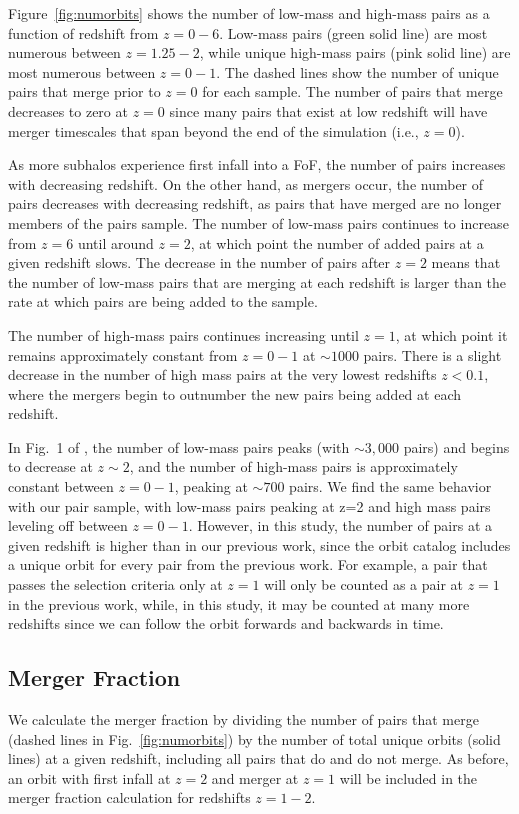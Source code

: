 \documentclass[twocolumn,linenumbers]{aastex631}
\newcommand{\chambe}{\citet{Chamberlain2024}}
\begin{document}
Figure~\ref{fig:numorbits} shows the number of low-mass and high-mass pairs as a function of redshift from $z=0-6$. 
Low-mass pairs (green solid line) are most numerous between $z=1.25-2$, while unique high-mass pairs (pink solid line) are most numerous between $z=0-1$.
The dashed lines show the number of unique pairs that merge prior to $z=0$ for each sample. 
The number of pairs that merge decreases to zero at $z=0$ since many pairs that exist at low redshift will have merger timescales that span beyond the end of the simulation (i.e., $z=0$). 

As more subhalos experience first infall into a FoF, the number of pairs increases with decreasing redshift. 
On the other hand, as mergers occur, the number of pairs decreases with decreasing redshift, as pairs that have merged are no longer members of the pairs sample.
The number of low-mass pairs continues to increase from $z=6$ until around $z=2$, at which point the number of added pairs at a given redshift slows. 
The decrease in the number of pairs after $z=2$ means that the number of low-mass pairs that are merging at each redshift is larger than the rate at which pairs are being added to the sample.

The number of high-mass pairs continues increasing until $z=1$, at which point it remains approximately constant from $z=0-1$ at $\sim1000$ pairs. 
There is a slight decrease in the number of high mass pairs at the very lowest redshifts $z<0.1$, where the mergers begin to outnumber the new pairs being added at each redshift.

In Fig.~1 of \chambe{}, the number of low-mass pairs peaks (with $\sim3,000$ pairs) and begins to decrease at $z\sim2$, and the number of high-mass pairs is approximately constant between $z=0-1$, peaking at $\sim700$ pairs. 
We find the same behavior with our pair sample, with low-mass pairs peaking at z=2 and high mass pairs leveling off between $z=0-1$. 
However, in this study, the number of pairs at a given redshift is higher than in our previous work, since the orbit catalog includes a unique orbit for every pair from the previous work.
For example, a pair that passes the \chambe{} selection criteria only at $z=1$ will only be counted as a pair at $z=1$ in the previous work, while, in this study, it may be counted at many more redshifts since we can follow the orbit forwards and backwards in time. 


\subsection{Merger Fraction}\label{sec:pairprops-frac}
We calculate the merger fraction by dividing the number of pairs that merge (dashed lines in Fig.~\ref{fig:numorbits}) by the number of total unique orbits (solid lines) at a given redshift, including all pairs that do and do not merge. 
As before, an orbit with first infall at $z=2$ and merger at $z=1$ will be included in the merger fraction calculation for redshifts $z=1-2$.
\end{document}
